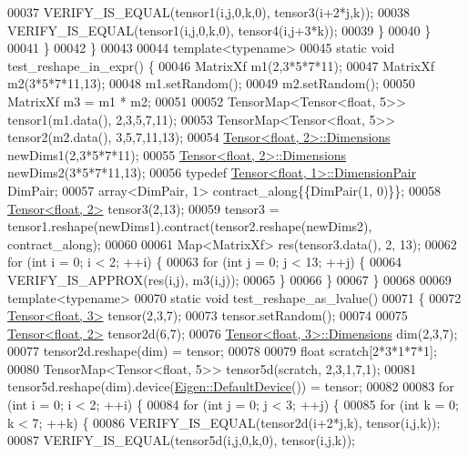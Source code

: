 \begin{DoxyCode}
00037         VERIFY\_IS\_EQUAL(tensor1(i,j,0,k,0), tensor3(i+2*j,k));
00038         VERIFY\_IS\_EQUAL(tensor1(i,j,0,k,0), tensor4(i,j+3*k));
00039       \}
00040     \}
00041   \}
00042 \}
00043 
00044 \textcolor{keyword}{template}<\textcolor{keyword}{typename}>
00045 \textcolor{keyword}{static} \textcolor{keywordtype}{void} test\_reshape\_in\_expr() \{
00046   MatrixXf m1(2,3*5*7*11);
00047   MatrixXf m2(3*5*7*11,13);
00048   m1.setRandom();
00049   m2.setRandom();
00050   MatrixXf m3 = m1 * m2;
00051 
00052   TensorMap<Tensor<float, 5>> tensor1(m1.data(), 2,3,5,7,11);
00053   TensorMap<Tensor<float, 5>> tensor2(m2.data(), 3,5,7,11,13);
00054   \hyperlink{class_eigen_1_1_tensor}{Tensor<float, 2>::Dimensions} newDims1(2,3*5*7*11);
00055   \hyperlink{class_eigen_1_1_tensor}{Tensor<float, 2>::Dimensions} newDims2(3*5*7*11,13);
00056   \textcolor{keyword}{typedef} \hyperlink{class_eigen_1_1_tensor}{Tensor<float, 1>::DimensionPair} DimPair;
00057   array<DimPair, 1> contract\_along\{\{DimPair(1, 0)\}\};
00058   \hyperlink{class_eigen_1_1_tensor}{Tensor<float, 2>} tensor3(2,13);
00059   tensor3 = tensor1.reshape(newDims1).contract(tensor2.reshape(newDims2), contract\_along);
00060 
00061   Map<MatrixXf> res(tensor3.data(), 2, 13);
00062   \textcolor{keywordflow}{for} (\textcolor{keywordtype}{int} i = 0; i < 2; ++i) \{
00063     \textcolor{keywordflow}{for} (\textcolor{keywordtype}{int} j = 0; j < 13; ++j) \{
00064       VERIFY\_IS\_APPROX(res(i,j), m3(i,j));
00065     \}
00066   \}
00067 \}
00068 
00069 \textcolor{keyword}{template}<\textcolor{keyword}{typename}>
00070 \textcolor{keyword}{static} \textcolor{keywordtype}{void} test\_reshape\_as\_lvalue()
00071 \{
00072   \hyperlink{class_eigen_1_1_tensor}{Tensor<float, 3>} tensor(2,3,7);
00073   tensor.setRandom();
00074 
00075   \hyperlink{class_eigen_1_1_tensor}{Tensor<float, 2>} tensor2d(6,7);
00076   \hyperlink{class_eigen_1_1_tensor}{Tensor<float, 3>::Dimensions} dim(2,3,7);
00077   tensor2d.reshape(dim) = tensor;
00078 
00079   \textcolor{keywordtype}{float} scratch[2*3*1*7*1];
00080   TensorMap<Tensor<float, 5>> tensor5d(scratch, 2,3,1,7,1);
00081   tensor5d.reshape(dim).device(\hyperlink{struct_eigen_1_1_default_device}{Eigen::DefaultDevice}()) = tensor;
00082 
00083   \textcolor{keywordflow}{for} (\textcolor{keywordtype}{int} i = 0; i < 2; ++i) \{
00084     \textcolor{keywordflow}{for} (\textcolor{keywordtype}{int} j = 0; j < 3; ++j) \{
00085       \textcolor{keywordflow}{for} (\textcolor{keywordtype}{int} k = 0; k < 7; ++k) \{
00086         VERIFY\_IS\_EQUAL(tensor2d(i+2*j,k), tensor(i,j,k));
00087         VERIFY\_IS\_EQUAL(tensor5d(i,j,0,k,0), tensor(i,j,k));

\end{DoxyCode}
